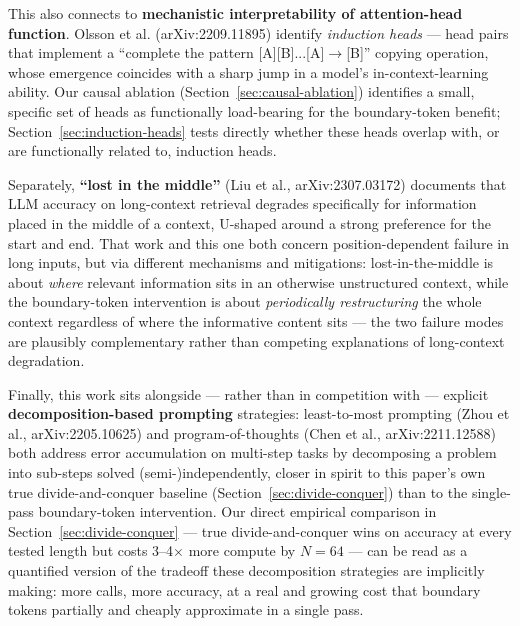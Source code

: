 \documentclass[11pt]{article}
\begin{document}
This also connects to \textbf{mechanistic interpretability of attention-head function}. Olsson et al. (arXiv:2209.11895) identify \emph{induction heads} --- head pairs that implement a ``complete the pattern [A][B]...[A]$\to$[B]'' copying operation, whose emergence coincides with a sharp jump in a model's in-context-learning ability. Our causal ablation (Section~\ref{sec:causal-ablation}) identifies a small, specific set of heads as functionally load-bearing for the boundary-token benefit; Section~\ref{sec:induction-heads} tests directly whether these heads overlap with, or are functionally related to, induction heads.

Separately, \textbf{``lost in the middle''} (Liu et al., arXiv:2307.03172) documents that LLM accuracy on long-context retrieval degrades specifically for information placed in the middle of a context, U-shaped around a strong preference for the start and end. That work and this one both concern position-dependent failure in long inputs, but via different mechanisms and mitigations: lost-in-the-middle is about \emph{where} relevant information sits in an otherwise unstructured context, while the boundary-token intervention is about \emph{periodically restructuring} the whole context regardless of where the informative content sits --- the two failure modes are plausibly complementary rather than competing explanations of long-context degradation.

Finally, this work sits alongside --- rather than in competition with --- explicit \textbf{decomposition-based prompting} strategies: least-to-most prompting (Zhou et al., arXiv:2205.10625) and program-of-thoughts (Chen et al., arXiv:2211.12588) both address error accumulation on multi-step tasks by decomposing a problem into sub-steps solved (semi-)independently, closer in spirit to this paper's own true divide-and-conquer baseline (Section~\ref{sec:divide-conquer}) than to the single-pass boundary-token intervention. Our direct empirical comparison in Section~\ref{sec:divide-conquer} --- true divide-and-conquer wins on accuracy at every tested length but costs 3--4$\times$ more compute by $N=64$ --- can be read as a quantified version of the tradeoff these decomposition strategies are implicitly making: more calls, more accuracy, at a real and growing cost that boundary tokens partially and cheaply approximate in a single pass.
\end{document}

